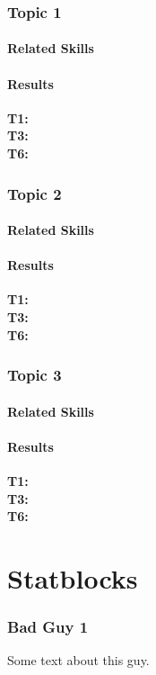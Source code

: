 \documentclass{ShadowTeXSR5}
\begin{document}
\subsection{Topic 1}
\lipsum[1]
\subsubsection{Related Skills}
\lipsum[1]
\subsubsection{Results}
\textbf{T1:}\\
\textbf{T3:}\\
\textbf{T6:}\\

\subsection{Topic 2}
\lipsum[1]
\subsubsection{Related Skills}
\lipsum[1]
\subsubsection{Results}
\lipsum[1]
\textbf{T1:}\\
\textbf{T3:}\\
\textbf{T6:}\\

\subsection{Topic 3}
\lipsum[1]
\subsubsection{Related Skills}
\lipsum[1]
\subsubsection{Results}
\lipsum[1]
\textbf{T1:}\\
\textbf{T3:}\\
\textbf{T6:}\\

\chapter{Statblocks}
\subsection{Bad Guy 1}
Some text about this guy.
\end{document}
